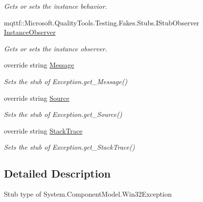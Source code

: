 \begin{DoxyCompactItemize}
\begin{DoxyCompactList}\small\item\em Gets or sets the instance behavior.\end{DoxyCompactList}\item 
mqttf\-::\-Microsoft.\-Quality\-Tools.\-Testing.\-Fakes.\-Stubs.\-I\-Stub\-Observer \hyperlink{class_system_1_1_component_model_1_1_fakes_1_1_stub_win32_exception_a3b94d6ed0da1448a19518593aba258ef}{Instance\-Observer}
\begin{DoxyCompactList}\small\item\em Gets or sets the instance observer.\end{DoxyCompactList}\item 
override string \hyperlink{class_system_1_1_component_model_1_1_fakes_1_1_stub_win32_exception_ae3f2cc46b1f0b266d31a6f795900bd4e}{Message}
\begin{DoxyCompactList}\small\item\em Sets the stub of Exception.\-get\-\_\-\-Message()\end{DoxyCompactList}\item 
override string \hyperlink{class_system_1_1_component_model_1_1_fakes_1_1_stub_win32_exception_a1d58a0bf5a4960b001540de55b6795e2}{Source}
\begin{DoxyCompactList}\small\item\em Sets the stub of Exception.\-get\-\_\-\-Source()\end{DoxyCompactList}\item 
override string \hyperlink{class_system_1_1_component_model_1_1_fakes_1_1_stub_win32_exception_af5fd4e11b9750f118492b05bec80e7d3}{Stack\-Trace}
\begin{DoxyCompactList}\small\item\em Sets the stub of Exception.\-get\-\_\-\-Stack\-Trace()\end{DoxyCompactList}\end{DoxyCompactItemize}


\subsection{Detailed Description}
Stub type of System.\-Component\-Model.\-Win32\-Exception



